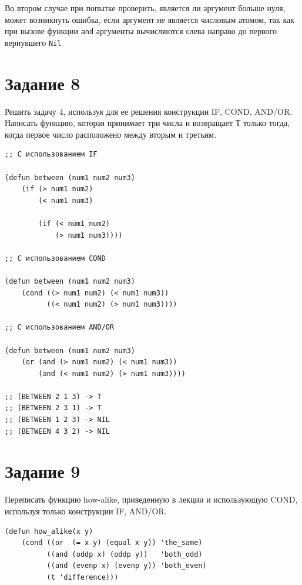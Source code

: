 \documentclass[a4paper,14pt, unknownkeysallowed]{extreport}
\begin{document}
Во втором случае при попытке проверить, является ли аргумент больше нуля, может возникнуть ошибка, если аргумент не является числовым атомом, так как при вызове функции \texttt{and} аргументы вычисляются слева направо до первого вернувшего \texttt{Nil}


\section{Задание 8}

Решить задачу 4, используя для ее решения конструкции IF, COND, AND/OR. Написать функцию, которая принимает три числа и возвращает Т только тогда, когда первое число расположено между вторым и третьим.

\begin{center}
\captionsetup{justification=raggedright,singlelinecheck=off}
\begin{lstlisting}[label=lst:parallel_processing,caption=Решение задания 8]
;; С использованием IF

(defun between (num1 num2 num3)
    (if (> num1 num2) 
        (< num1 num3)

        (if (< num1 num2) 
            (> num1 num3))))

;; С использованием COND

(defun between (num1 num2 num3)
	(cond ((> num1 num2) (< num1 num3))
		  ((< num1 num2) (> num1 num3))))

;; С использованием AND/OR

(defun between (num1 num2 num3)
	(or (and (> num1 num2) (< num1 num3))
		(and (< num1 num2) (> num1 num3))))

;; (BETWEEN 2 1 3) -> T
;; (BETWEEN 2 3 1) -> T
;; (BETWEEN 1 2 3) -> NIL
;; (BETWEEN 4 3 2) -> NIL
\end{lstlisting}
\end{center}

\clearpage

\section{Задание 9}

Переписать функцию how-alike, приведенную в лекции и использующую COND, используя только конструкции IF, AND/OR.

\begin{center}
\captionsetup{justification=raggedright,singlelinecheck=off}
\begin{lstlisting}[label=lst:parallel_processing,caption=Функция how-alike из лекции]
(defun how_alike(x y)
    (cond ((or  (= x y) (equal x y)) 'the_same)
          ((and (oddp x) (oddp y))   'both_odd) 
          ((and (evenp x) (evenp y)) 'both_even) 
          (t 'difference)))
\end{lstlisting}
\end{center}
\end{document}
